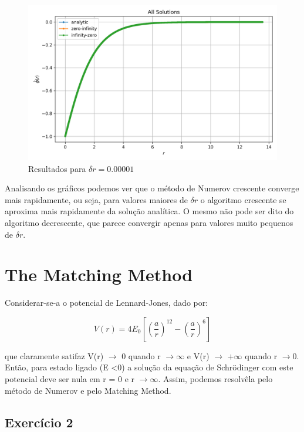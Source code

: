 \documentclass[12pt, a4paper]{article} %
\begin{document}
        \begin{figure}[H]
            \centering
            \includegraphics[scale=0.7]{../images/all-plots-1e-05.png}
            \caption{Resultados para $\delta r = 0.00001$}
            \label{fig:all-plots-0.00001}
        \end{figure}

        Analisando os gr\'aficos podemos ver que o m\'etodo de Numerov crescente converge mais rapidamente, ou seja, para valores maiores de $\delta r$ o algoritmo crescente se aproxima mais rapidamente da solu\c{c}\~ao anal\'itica. O mesmo n\~ao pode ser dito do algoritmo decrescente, que parece convergir apenas para valores muito pequenos de $\delta r$.

\section{The Matching Method}

        Considerar-se-a o potencial de Lennard-Jones, dado por:

        \begin{equation*}
            V(r) = 4E_{0} \left[ \left( \frac{a}{r} \right)^{12} - \left( \frac{a}{r} \right)^{6} \right]
        \end{equation*}

        que claramente satifaz V(r) $\to$ 0 quando r $\to \infty$ e V(r) $\to$ $+ \infty$ quando r $\to 0$. Ent\~ao, para estado ligado (E \textless  0) a solu\c{c}\~ao da equa\c{c}\~ao de Schr\"odinger com este potencial deve ser nula em r = 0 e r $\to \infty$. Assim, podemos resolv\^ela pelo m\'etodo de Numerov e pelo Matching Method.

        \subsection{Exerc\'icio 2}
\end{document}
